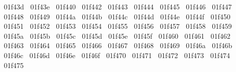{  ^^^^^^01f43d%
  ^^^^^^01f43e%
  ^^^^^^01f440%
  ^^^^^^01f442%
  ^^^^^^01f443%
  ^^^^^^01f444%
  ^^^^^^01f445%
  ^^^^^^01f446%
  ^^^^^^01f447%
  ^^^^^^01f448%
  ^^^^^^01f449%
  ^^^^^^01f44a%
  ^^^^^^01f44b%
  ^^^^^^01f44c%
  ^^^^^^01f44d%
  ^^^^^^01f44e%
  ^^^^^^01f44f%
  ^^^^^^01f450%
  ^^^^^^01f451%
  ^^^^^^01f452%
  ^^^^^^01f453%
  ^^^^^^01f454%
  ^^^^^^01f455%
  ^^^^^^01f456%
  ^^^^^^01f457%
  ^^^^^^01f458%
  ^^^^^^01f459%
  ^^^^^^01f45a%
  ^^^^^^01f45b%
  ^^^^^^01f45c%
  ^^^^^^01f45d%
  ^^^^^^01f45e%
  ^^^^^^01f45f%
  ^^^^^^01f460%
  ^^^^^^01f461%
  ^^^^^^01f462%
  ^^^^^^01f463%
  ^^^^^^01f464%
  ^^^^^^01f465%
  ^^^^^^01f466%
  ^^^^^^01f467%
  ^^^^^^01f468%
  ^^^^^^01f469%
  ^^^^^^01f46a%
  ^^^^^^01f46b%
  ^^^^^^01f46c%
  ^^^^^^01f46d%
  ^^^^^^01f46e%
  ^^^^^^01f46f%
  ^^^^^^01f470%
  ^^^^^^01f471%
  ^^^^^^01f472%
  ^^^^^^01f473%
  ^^^^^^01f474%
  ^^^^^^01f475%
}
